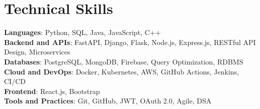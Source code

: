 \documentclass[letterpaper,11pt]{article}
\begin{document}
\section{Technical Skills}
 \begin{itemize}[leftmargin=0.15in, label={}]
    \small{\item{
     
     \textbf{Languages}{: Python, SQL, Java, JavaScript, C++} \\
     
     \textbf{Backend and APIs}{: FastAPI, Django, Flask, Node.js, Express.js, RESTful API Design, Microservices} \\
     
     \textbf{Databases}{: PostgreSQL, MongoDB, Firebase, Query Optimization, RDBMS} \\
     
     \textbf{Cloud and DevOps}{: Docker, Kubernetes, AWS, GitHub Actions, Jenkins, CI/CD} \\
     
     \textbf{Frontend}{: React.js, Bootstrap} \\
     
     \textbf{Tools and Practices}{: Git, GitHub, JWT, OAuth 2.0, Agile, DSA} \\
     
    }}
 \end{itemize}
\end{document}
